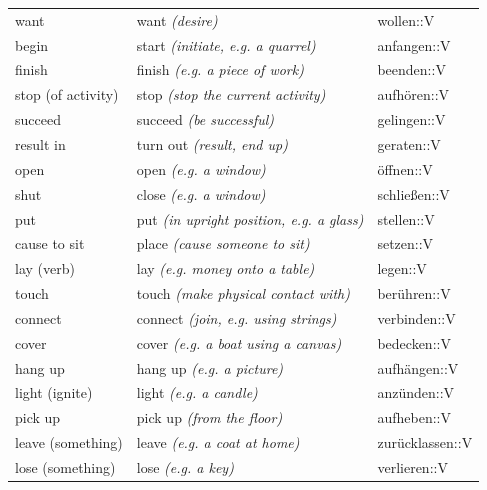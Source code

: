 \begin{center}
\begin{longtable}{lll}
{\sc \lowercase{	WANT	}}	&	want	\textit{\footnotesize (desire)}	&	wollen::V	\\
{\sc \lowercase{	BEGIN	}}	&	start	\textit{\footnotesize (initiate, e.g. a quarrel)}	&	anfangen::V	\\
{\sc \lowercase{	FINISH	}}	&	finish	\textit{\footnotesize (e.g. a piece of work)}	&	beenden::V	\\
{\sc \lowercase{	STOP \footnotesize (OF ACTIVITY)	}}	&	stop	\textit{\footnotesize (stop the current activity)}	&	aufhören::V	\\
{\sc \lowercase{	SUCCEED	}}	&	succeed	\textit{\footnotesize (be successful)}	&	gelingen::V	\\
{\sc \lowercase{	RESULT IN	}}	&	turn out	\textit{\footnotesize (result, end up)}	&	geraten::V	\\
{\sc \lowercase{	OPEN	}}	&	open	\textit{\footnotesize (e.g. a window)}	&	öffnen::V	\\
{\sc \lowercase{	SHUT	}}	&	close	\textit{\footnotesize (e.g. a window)}	&	schließen::V	\\
{\sc \lowercase{	PUT	}}	&	put	\textit{\footnotesize (in upright position, e.g. a glass)}	&	stellen::V	\\
{\sc \lowercase{	CAUSE TO SIT	}}	&	place	\textit{\footnotesize (cause someone to sit)}	&	setzen::V	\\
{\sc \lowercase{	LAY \footnotesize (VERB)	}}	&	lay	\textit{\footnotesize (e.g. money onto a table)}	&	legen::V	\\
{\sc \lowercase{	TOUCH	}}	&	touch	\textit{\footnotesize (make physical contact with)}	&	berühren::V	\\
{\sc \lowercase{	CONNECT	}}	&	connect	\textit{\footnotesize (join, e.g. using strings)}	&	verbinden::V	\\
{\sc \lowercase{	COVER	}}	&	cover	\textit{\footnotesize (e.g. a boat using a canvas)}	&	bedecken::V	\\
{\sc \lowercase{	HANG UP	}}	&	hang up	\textit{\footnotesize (e.g. a picture)}	&	aufhängen::V	\\
{\sc \lowercase{	LIGHT \footnotesize (IGNITE)	}}	&	light	\textit{\footnotesize (e.g. a candle)}	&	anzünden::V	\\
{\sc \lowercase{	PICK UP	}}	&	pick up	\textit{\footnotesize (from the floor)}	&	aufheben::V	\\
{\sc \lowercase{	LEAVE \footnotesize (SOMETHING)	}}	&	leave	\textit{\footnotesize (e.g. a coat at home)}	&	zurücklassen::V	\\
{\sc \lowercase{	LOSE \footnotesize (SOMETHING)	}}	&	lose	\textit{\footnotesize (e.g. a key)}	&	verlieren::V	\\

\end{longtable}
\end{center}
